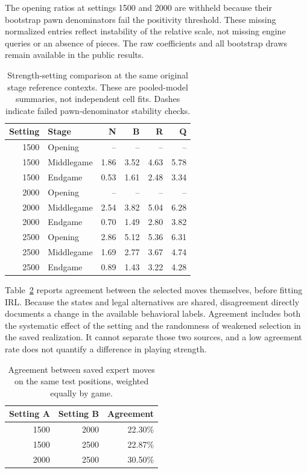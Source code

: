 \documentclass{jcst}
\begin{document}
The opening ratios at settings 1500 and 2000 are withheld because their bootstrap pawn denominators fail the positivity threshold. These missing normalized entries reflect instability of the relative scale, not missing engine queries or an absence of pieces. The raw coefficients and all bootstrap draws remain available in the public results.
\begin{table}[tbp]\centering
\small
\caption{Strength-setting comparison at the same original stage reference contexts. These are pooled-model summaries, not independent cell fits. Dashes indicate failed pawn-denominator stability checks.}\label{tab:elostages}
\begin{tabular}{rlrrrr}
\toprule
Setting & Stage & N & B & R & Q\\\midrule
1500 & Opening & -- & -- & -- & --\\
1500 & Middlegame & 1.86 & 3.52 & 4.63 & 5.78\\
1500 & Endgame & 0.53 & 1.61 & 2.48 & 3.34\\
2000 & Opening & -- & -- & -- & --\\
2000 & Middlegame & 2.54 & 3.82 & 5.04 & 6.28\\
2000 & Endgame & 0.70 & 1.49 & 2.80 & 3.82\\
2500 & Opening & 2.86 & 5.12 & 5.36 & 6.31\\
2500 & Middlegame & 1.69 & 2.77 & 3.67 & 4.74\\
2500 & Endgame & 0.89 & 1.43 & 3.22 & 4.28\\
\bottomrule\end{tabular}\end{table}

Table~\ref{tab:eloagree} reports agreement between the selected moves themselves, before fitting IRL. Because the states and legal alternatives are shared, disagreement directly documents a change in the available behavioral labels. Agreement includes both the systematic effect of the setting and the randomness of weakened selection in the saved realization. It cannot separate those two sources, and a low agreement rate does not quantify a difference in playing strength.
\begin{table}[tbp]\centering
\small
\caption{Agreement between saved expert moves on the same test positions, weighted equally by game.}\label{tab:eloagree}
\begin{tabular}{rrr}
\toprule
Setting A & Setting B & Agreement\\\midrule
1500 & 2000 & 22.30\%\\
1500 & 2500 & 22.87\%\\
2000 & 2500 & 30.50\%\\
\bottomrule\end{tabular}\end{table}
\end{document}
